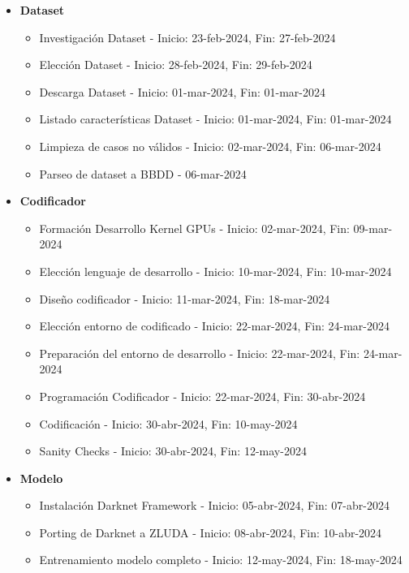 \begin{itemize}
    \item \textbf{Dataset}
    \begin{itemize}
        \item Investigación Dataset - Inicio: 23-feb-2024, Fin: 27-feb-2024
        \item Elección Dataset - Inicio: 28-feb-2024, Fin: 29-feb-2024
        \item Descarga Dataset - Inicio: 01-mar-2024, Fin: 01-mar-2024
        \item Listado características Dataset - Inicio: 01-mar-2024, Fin: 01-mar-2024
        \item Limpieza de casos no válidos - Inicio: 02-mar-2024, Fin: 06-mar-2024
        \item Parseo de dataset a BBDD - 06-mar-2024
    \end{itemize}
    \item \textbf{Codificador}
    \begin{itemize}
        \item Formación Desarrollo Kernel GPUs - Inicio: 02-mar-2024, Fin: 09-mar-2024
        \item Elección lenguaje de desarrollo - Inicio: 10-mar-2024, Fin: 10-mar-2024
        \item Diseño codificador - Inicio: 11-mar-2024, Fin: 18-mar-2024
        \item Elección entorno de codificado - Inicio: 22-mar-2024, Fin: 24-mar-2024
        \item Preparación del entorno de desarrollo - Inicio: 22-mar-2024, Fin: 24-mar-2024
        \item Programación Codificador - Inicio: 22-mar-2024, Fin: 30-abr-2024
        \item Codificación - Inicio: 30-abr-2024, Fin: 10-may-2024
        \item Sanity Checks - Inicio: 30-abr-2024, Fin: 12-may-2024
    \end{itemize}
    \item \textbf{Modelo}
    \begin{itemize}
        \item Instalación Darknet Framework - Inicio: 05-abr-2024, Fin: 07-abr-2024
        \item Porting de Darknet a ZLUDA - Inicio: 08-abr-2024, Fin: 10-abr-2024
        \item Entrenamiento modelo completo - Inicio: 12-may-2024, Fin: 18-may-2024
    \end{itemize}

\end{itemize}
